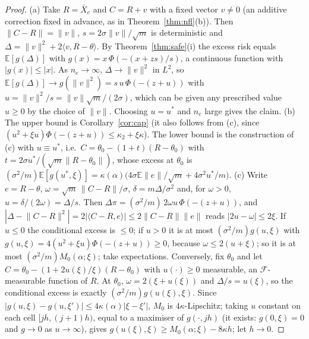 \documentclass[10pt,a4paper]{article}
\theoremstyle{plain}
\theoremstyle{definition}
\theoremstyle{remark}
\newcommand{\E}{\mathbb{E}}
\newcommand{\norm}[1]{\lVert #1\rVert}
\newcommand{\ip}[1]{\langle #1\rangle}
\begin{document}
\begin{proof}
(a) Take $R=\bar X_e$ and $C=R+v$ with a fixed vector $v\ne0$ (an additive correction fixed in advance, as in Theorem~\ref{thm:nfl}(b)). Then $\norm{C-R}=\norm v$, $s=2\sigma\norm v/\sqrt m$ is deterministic and $\Delta=\norm v^2+2\ip{v,R-\theta}$. By Theorem~\ref{thm:safe}(i) the excess risk equals $\E[g(\Delta)]$ with $g(x)=x\,\Phi(-(x+z s)/s)$, a continuous function with $|g(x)|\le|x|$. As $n_e\to\infty$, $\Delta\to\norm v^2$ in $L^2$, so $\E[g(\Delta)]\to g(\norm v^2)=s\,u\,\Phi(-(z+u))$ with $u=\norm v^2/s=\norm v\sqrt m/(2\sigma)$, which can be given any prescribed value $u\ge0$ by the choice of $\norm v$. Choosing $u=u^\ast$ and $n_e$ large gives the claim.
(b) The upper bound is Corollary~\ref{cor:cap} (it also follows from (c), since $(u^2+\xi u)\Phi(-(z+u))\le\kappa_2+\xi\kappa$). The lower bound is the construction of (c) with $u\equiv u^\ast$, i.e.\ $C=\theta_0-(1+t)(R-\theta_0)$ with $t=2\sigma u^\ast/(\sqrt m\norm{R-\theta_0})$, whose excess at $\theta_0$ is $(\sigma^2/m)\E[g(u^\ast,\xi)]=\kappa(\alpha)\big(4\sigma\E\norm e/\sqrt m+4\sigma^2u^\ast/m\big)$.
(c) Write $e=R-\theta$, $\omega=\sqrt m\,\norm{C-R}/\sigma$, $\delta=m\Delta/\sigma^2$ and, for $\omega>0$, $u=\delta/(2\omega)=\Delta/s$. Then $\Delta\pi=(\sigma^2/m)\,2\omega u\,\Phi(-(z+u))$, and $|\Delta-\norm{C-R}^2|=2|\ip{C-R,e}|\le2\norm{C-R}\norm e$ reads $|2u-\omega|\le2\xi$. If $u\le0$ the conditional excess is $\le0$; if $u>0$ it is at most $(\sigma^2/m)g(u,\xi)$ with $g(u,\xi)=4(u^2+\xi u)\Phi(-(z+u))\ge0$, because $\omega\le2(u+\xi)$; so it is at most $(\sigma^2/m)M_0(\alpha;\xi)$; take expectations. Conversely, fix $\theta_0$ and let $C=\theta_0-(1+2u(\xi)/\xi)(R-\theta_0)$ with $u(\cdot)\ge0$ measurable, an $\mathcal F$-measurable function of $R$. At $\theta_0$, $\omega=2(\xi+u(\xi))$ and $\Delta/s=u(\xi)$, so the conditional excess is exactly $(\sigma^2/m)g(u(\xi),\xi)$. Since $|g(u,\xi)-g(u,\xi')|\le4\kappa(\alpha)|\xi-\xi'|$, $M_0$ is $4\kappa$-Lipschitz; taking $u$ constant on each cell $[jh,(j+1)h)$, equal to a maximiser of $g(\cdot,jh)$ (it exists: $g(0,\xi)=0$ and $g\to0$ as $u\to\infty$), gives $g(u(\xi),\xi)\ge M_0(\alpha;\xi)-8\kappa h$; let $h\to0$.
\end{proof}
\end{document}

